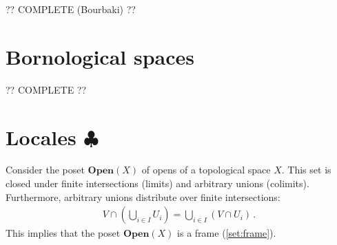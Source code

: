     ?? COMPLETE (Bourbaki) ??

\section{Bornological spaces}


    ?? COMPLETE ??

\section{\texorpdfstring{Locales $\clubsuit$}{Locales}}

    \begin{property}
        Consider the poset $\mathbf{Open}(X)$ of opens of a topological space $X$. This set is closed under finite intersections (limits) and arbitrary unions (colimits). Furthermore, arbitrary unions distribute over finite intersections:
        \begin{gather}
            V\cap\left(\bigcup_{i\in I}U_i\right) = \bigcup_{i\in I}\left(V\cap U_i\right)\,.
        \end{gather}
        This implies that the poset $\mathbf{Open}(X)$ is a frame (\cref{set:frame}).
    \end{property}

